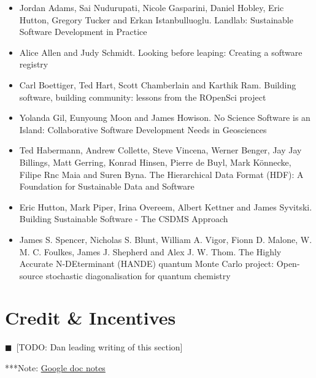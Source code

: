 \documentclass[11pt, oneside]{amsart}
\newcommand{\todo}[1]{{\color{blue}$\blacksquare$~\textsf{[TODO: #1]}}}
\newcommand{\note}[1]{ {\textcolor{blueish}    { ***Note:      #1 }}}
\begin{document}
\begin{itemize}

\item Jordan Adams, Sai Nudurupati, Nicole Gasparini, Daniel Hobley, Eric
Hutton, Gregory Tucker and Erkan Istanbulluoglu. Landlab: Sustainable Software
Development in Practice ~\cite{wssspe2_adams}

\item Alice Allen and Judy Schmidt. Looking before leaping: Creating a software
registry~\cite{wssspe2_allen}

\item Carl Boettiger, Ted Hart, Scott Chamberlain and Karthik Ram. Building
software, building community: lessons from the {ROpenSci}
project~\cite{wssspe2_boettiger}

\item Yolanda Gil, Eunyoung Moon and James Howison. No Science Software is an
Island: Collaborative Software Development Needs in
Geosciences~\cite{wssspe2_gil}

\item Ted Habermann, Andrew Collette, Steve Vincena, Werner Benger, Jay Jay
Billings, Matt Gerring, Konrad Hinsen, Pierre de Buyl, Mark K\"{o}nnecke, Filipe
Rnc Maia and Suren Byna. The Hierarchical Data Format ({HDF}): A Foundation for
Sustainable Data and Software~\cite{wssspe2_habermann}

\item Eric Hutton, Mark Piper, Irina Overeem, Albert Kettner and James Syvitski.
Building Sustainable Software - The {CSDMS} Approach~\cite{wssspe2_hutton}

\item James S. Spencer, Nicholas S. Blunt, William A. Vigor, Fionn D. Malone, W.
M. C. Foulkes, James J. Shepherd and Alex J. W. Thom. The {H}ighly {A}ccurate
{N-DE}terminant ({HANDE}) quantum {Monte Carlo} project: Open-source stochastic
diagonalisation for quantum chemistry~\cite{wssspe2_spencer}
\end{itemize}

\section{Credit \& Incentives} \label{sec:credit}
\todo{Dan leading writing of this section}

\note{\href{http://tinyurl.com/k8ruyn9}{Google doc notes}}
\end{document}

